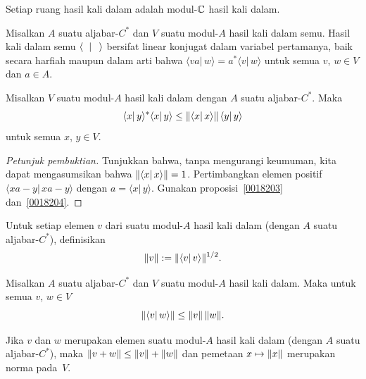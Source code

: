 \begin{exam} Setiap ruang hasil kali dalam adalah modul-$\mathbb{C}$ hasil kali dalam.
\end{exam}

\begin{prop} Misalkan $A$ suatu aljabar-$C^*$ dan $V$ suatu modul-$A$ hasil kali dalam semu.
Hasil kali dalam semu $\langle\hphantom{x}\vert\,\hphantom{x}\rangle$ bersifat linear konjugat
dalam variabel pertamanya, baik secara harfiah maupun dalam arti bahwa $\langle va \vert\,
w\rangle = a^* \langle v \vert\, w\rangle$ untuk semua $v$, $w \in V$ dan $a \in A$.
\end{prop}

\begin{prop}\label{0038038} Misalkan
$V$ suatu modul-$A$ hasil kali dalam dengan $A$ suatu aljabar-$C^*$. Maka
  \[ \langle x\vert\, y \rangle^*\langle x\vert\, y \rangle
          \le \lVert\langle x\vert\, x \rangle\rVert\,\langle y\vert\, y \rangle \]
untuk semua $x$, $y \in V$.
\end{prop}

\begin{proof}[\emph{Petunjuk pembuktian}] Tunjukkan bahwa, tanpa mengurangi keumuman,
kita dapat mengasumsikan bahwa
$\lVert\langle x\vert\, x\rangle\rVert = 1$. Pertimbangkan elemen positif $\langle xa -
y\vert\, xa - y\rangle$ dengan $a = \langle x \vert\, y \rangle$. Gunakan
proposisi~\ref{0018203} dan~\ref{0018204}. \ns
\end{proof}

\begin{defn}\label{0038041} Untuk setiap elemen $v$ dari suatu modul-$A$ hasil kali dalam
(dengan $A$ suatu aljabar-$C^*$), definisikan
  \[ \lVert v\rVert := \lVert\langle v \vert\, v \rangle\rVert^{1/2}. \]
\end{defn}

\begin{prop} Misalkan $A$ suatu aljabar-$C^*$ dan $V$ suatu
modul-$A$ hasil kali dalam. Maka untuk semua $v$, $w \in V$
  \[ \lVert\langle v \vert\, w\rangle\rVert \le \lVert v\rVert\,\lVert w\rVert. \]
\end{prop}

\begin{cor} Jika $v$ dan $w$ merupakan elemen suatu modul-$A$ hasil kali dalam (dengan $A$ suatu
aljabar-$C^*$), maka $\lVert v + w\rVert \le \lVert v\rVert + \lVert w\rVert$ dan pemetaan $x \mapsto \lVert x\rVert$
merupakan norma pada~$V$.
\end{cor}

